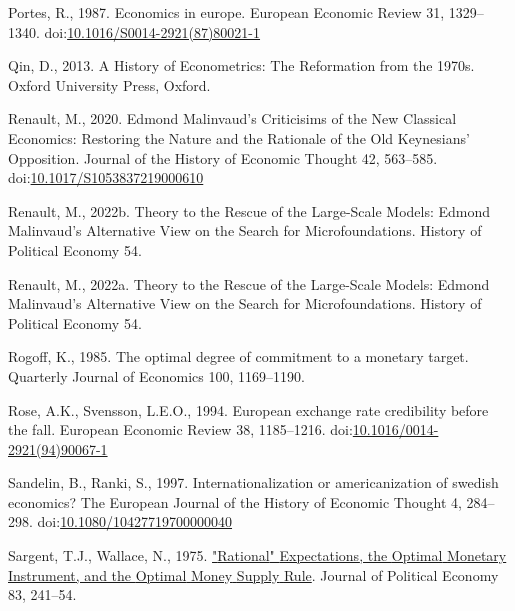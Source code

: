 \documentclass[
  12pt,
  onecolumn]{article}
\newlength{\cslhangindent}
\newlength{\cslentryspacingunit} %
\newenvironment{CSLReferences}[2] %
 {%
  \setlength{\parindent}{0pt}
  \ifodd #1
  \let\oldpar\par
  \def\par{\hangindent=\cslhangindent\oldpar}
  \fi
  \setlength{\parskip}{#2\cslentryspacingunit}
 }%
 {}
\begin{document}
\begin{CSLReferences}{1}{0}
\leavevmode{}%
Portes, R., 1987. Economics in europe. European Economic Review 31,
1329--1340.
doi:\href{https://doi.org/10.1016/S0014-2921(87)80021-1}{10.1016/S0014-2921(87)80021-1}

\leavevmode{}%
Qin, D., 2013. {A History of Econometrics: The Reformation from the
1970s}. {Oxford University Press}, {Oxford}.

\leavevmode{}%
Renault, M., 2020. Edmond {Malinvaud}'s {Criticisims} of the {New
Classical Economics}: {Restoring} the {Nature} and the {Rationale} of
the {Old Keynesians}' {Opposition}. Journal of the History of Economic
Thought 42, 563--585.
doi:\href{https://doi.org/10.1017/S1053837219000610}{10.1017/S1053837219000610}

\leavevmode{}%
Renault, M., 2022b. Theory to the {Rescue} of the {Large-Scale Models}:
{Edmond Malinvaud}'s {Alternative View} on the {Search} for
{Microfoundations}. History of Political Economy 54.

\leavevmode{}%
Renault, M., 2022a. Theory to the {Rescue} of the {Large-Scale Models}:
{Edmond Malinvaud}'s {Alternative View} on the {Search} for
{Microfoundations}. History of Political Economy 54.

\leavevmode{}%
Rogoff, K., 1985. The optimal degree of commitment to a monetary target.
Quarterly Journal of Economics 100, 1169--1190.

\leavevmode{}%
Rose, A.K., Svensson, L.E.O., 1994. European exchange rate credibility
before the fall. European Economic Review 38, 1185--1216.
doi:\href{https://doi.org/10.1016/0014-2921(94)90067-1}{10.1016/0014-2921(94)90067-1}

\leavevmode{}%
Sandelin, B., Ranki, S., 1997. Internationalization or americanization
of swedish economics? The European Journal of the History of Economic
Thought 4, 284--298.
doi:\href{https://doi.org/10.1080/10427719700000040}{10.1080/10427719700000040}

\leavevmode{}%
Sargent, T.J., Wallace, N., 1975.
\href{http://econpapers.repec.org/article/ucpjpolec/v_3A83_3Ay_3A1975_3Ai_3A2_3Ap_3A241-54.htm}{"{Rational}"
{Expectations}, the {Optimal} {Monetary} {Instrument}, and the {Optimal}
{Money} {Supply} {Rule}}. Journal of Political Economy 83, 241--54.


\end{CSLReferences}
\end{document}
